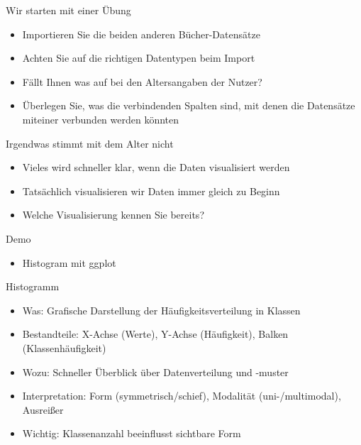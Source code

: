 \documentclass[
  ignorenonframetext,
]{beamer}
\providecommand{\tightlist}{%
  \setlength{\itemsep}{0pt}\setlength{\parskip}{0pt}}
\begin{document}
\begin{frame}{Wir starten mit einer Übung}
\protect{}\label{wir-starten-mit-einer-uxfcbung}
\begin{itemize}
\tightlist
\item
  Importieren Sie die beiden anderen Bücher-Datensätze
\item
  Achten Sie auf die richtigen Datentypen beim Import
\item
  Fällt Ihnen was auf bei den Altersangaben der Nutzer?
\item
  Überlegen Sie, was die verbindenden Spalten sind, mit denen die
  Datensätze miteiner verbunden werden könnten
\end{itemize}
\end{frame}

\begin{frame}{Irgendwas stimmt mit dem Alter nicht}
\protect{}\label{irgendwas-stimmt-mit-dem-alter-nicht}
\begin{itemize}
\tightlist
\item
  Vieles wird schneller klar, wenn die Daten visualisiert werden
\item
  Tatsächlich visualisieren wir Daten immer gleich zu Beginn
\item
  Welche Visualisierung kennen Sie bereits?
\end{itemize}
\end{frame}

\begin{frame}{Demo}
\protect{}\label{demo}
\begin{itemize}
\tightlist
\item
  Histogram mit ggplot
\end{itemize}
\end{frame}

\begin{frame}{Histogramm}
\protect{}\label{histogramm}
\begin{itemize}
\tightlist
\item
  Was: Grafische Darstellung der Häufigkeitsverteilung in Klassen
\item
  Bestandteile: X-Achse (Werte), Y-Achse (Häufigkeit), Balken
  (Klassenhäufigkeit)
\item
  Wozu: Schneller Überblick über Datenverteilung und -muster
\item
  Interpretation: Form (symmetrisch/schief), Modalität
  (uni-/multimodal), Ausreißer
\item
  Wichtig: Klassenanzahl beeinflusst sichtbare Form
\end{itemize}
\end{frame}
\end{document}

